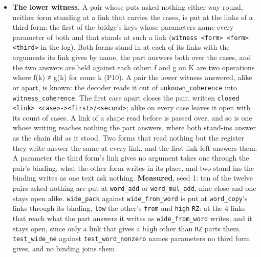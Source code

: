 \begin{itemize}
\item \textbf{The lower witness.} A pair whose puts asked nothing either way round, neither form standing at a link that carries the cases, is put at the links of a third form: the first of the bridge's keys whose parameters name every parameter of both and that stands at such a link (\texttt{witness <form> <form> <third>} in the log). Both forms stand in at each of its links with the arguments its link gives by name, the part answers both over the cases, and the two answers are held against each other: f and g on K are two operations where f(k) ≠ g(k) for some k (P10). A pair the lower witness answered, alike or apart, is known: the decoder reads it out of \texttt{unknown\_\allowbreak{}coherence} into \texttt{witness\_\allowbreak{}coherence}. The first case apart closes the pair, written \texttt{closed <link> <case>-\allowbreak{}><first>/\allowbreak{}<second>}; alike on every case leaves it open with its count of cases. A link of a shape read before is passed over, and so is one whose writing reaches nothing the part answers, where both stand-ins answer as the chain did as it stood. Two forms that read nothing but the register they write answer the same at every link, and the first link left answers them. A parameter the third form's link gives no argument takes one through the pair's binding, what the other form writes in its place, and two stand-ins the binding writes as one text ask nothing. \textbf{Measured}, seed 1: ten of the twelve pairs asked nothing are put at \texttt{word\_\allowbreak{}add} or \texttt{word\_\allowbreak{}mul\_\allowbreak{}add}, nine close and one stays open alike. \texttt{wide\_\allowbreak{}pack} against \texttt{wide\_\allowbreak{}from\_\allowbreak{}word} is put at \texttt{word\_\allowbreak{}copy}'s links through its binding, \texttt{low} the other's \texttt{from} and \texttt{high} \texttt{RZ}: at the 4 links that reach what the part answers it writes as \texttt{wide\_\allowbreak{}from\_\allowbreak{}word} writes, and it stays open, since only a link that gives a \texttt{high} other than \texttt{RZ} parts them. \texttt{test\_\allowbreak{}wide\_\allowbreak{}ne} against \texttt{test\_\allowbreak{}word\_\allowbreak{}nonzero} names parameters no third form gives, and no binding joins them.

\end{itemize}

